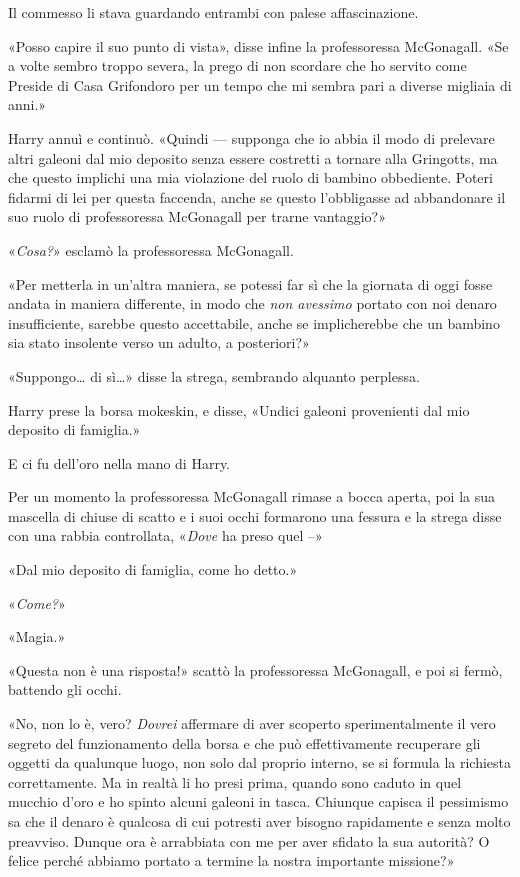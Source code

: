 Il commesso li stava guardando entrambi con palese affascinazione.

«Posso capire il suo punto di vista», disse infine la professoressa McGonagall. «Se a volte sembro troppo severa, la prego di non scordare che ho servito come Preside di Casa Grifondoro per un tempo che mi sembra pari a diverse migliaia di anni.»

Harry annuì e continuò. «Quindi — supponga che io abbia il modo di prelevare altri galeoni dal mio deposito senza essere costretti a tornare alla Gringotts, ma che questo implichi una mia violazione del ruolo di bambino obbediente. Poteri fidarmi di lei per questa faccenda, anche se questo l’obbligasse ad abbandonare il suo ruolo di professoressa McGonagall per trarne vantaggio?»

«\textit{Cosa?}» esclamò la professoressa McGonagall.

«Per metterla in un’altra maniera, se potessi far sì che la giornata di oggi fosse andata in maniera differente, in modo che \textit{non avessimo} portato con noi denaro insufficiente, sarebbe questo accettabile, anche se implicherebbe che un bambino sia stato insolente verso un adulto, a posteriori?»

«Suppongo… di sì…» disse la strega, sembrando alquanto perplessa.

Harry prese la borsa mokeskin, e disse, «Undici galeoni provenienti dal mio deposito di famiglia.»

E ci fu dell’oro nella mano di Harry.

Per un momento la professoressa McGonagall rimase a bocca aperta, poi la sua mascella di chiuse di scatto e i suoi occhi formarono una fessura e la strega disse con una rabbia controllata, «\textit{Dove} ha preso quel –»

«Dal mio deposito di famiglia, come ho detto.»

«\textit{Come?}»

«Magia.»

«Questa non è una risposta!» scattò la professoressa McGonagall, e poi si fermò, battendo gli occhi.

«No, non lo è, vero? \textit{Dovrei} affermare di aver scoperto sperimentalmente il vero segreto del funzionamento della borsa e che può effettivamente recuperare gli oggetti da qualunque luogo, non solo dal proprio interno, se si formula la richiesta correttamente. Ma in realtà li ho presi prima, quando sono caduto in quel mucchio d’oro e ho spinto alcuni galeoni in tasca. Chiunque capisca il pessimismo sa che il denaro è qualcosa di cui potresti aver bisogno rapidamente e senza molto preavviso. Dunque ora è arrabbiata con me per aver sfidato la sua autorità? O felice perché abbiamo portato a termine la nostra importante missione?»

